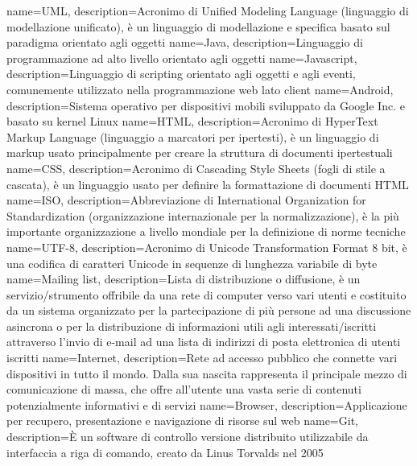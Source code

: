  {
	name=UML,
	description={Acronimo di Unified Modeling Language (linguaggio di modellazione
	unificato), è un linguaggio di modellazione e specifica basato sul paradigma
	orientato agli oggetti}
}
 {
	name=Java,
	description={Linguaggio di programmazione ad alto livello orientato agli oggetti}
}
 {
	name=Javascript,
	description={Linguaggio di scripting orientato agli oggetti e agli eventi, 
	comunemente utilizzato nella programmazione web lato client}
}
 {
	name=Android,
	description={Sistema operativo per dispositivi mobili sviluppato da Google Inc. e basato su kernel Linux}
}
 {
	name=HTML,
	description={Acronimo di HyperText Markup Language (linguaggio a marcatori per
	ipertesti), è un linguaggio di markup usato principalmente per creare la
	struttura di documenti ipertestuali}
}
 {
	name=CSS,
	description={Acronimo di Cascading Style Sheets (fogli di stile a cascata), è un linguaggio usato per
	definire la formattazione di documenti HTML}
}
 {
	name=ISO,
	description={Abbreviazione di International Organization for Standardization (organizzazione internazionale per la
	normalizzazione), è la più importante organizzazione a livello mondiale per la definizione di norme tecniche}
}
 {
	name=UTF-8,
	description={Acronimo di Unicode Transformation Format 8 bit, è una codifica di caratteri Unicode in sequenze di
	lunghezza variabile di byte}
}
 {
	name=Mailing list,
	description={Lista di distribuzione o diffusione, è un servizio/strumento offribile da una rete di computer verso
	vari utenti e costituito da un sistema organizzato per la partecipazione di più persone ad una discussione asincrona
	o per la distribuzione di informazioni utili agli interessati/iscritti attraverso l'invio di e-mail ad una lista di
	indirizzi di posta elettronica di utenti iscritti}
}
 {
	name=Internet,
	description={Rete ad accesso pubblico che connette vari dispositivi in tutto il mondo. Dalla sua nascita rappresenta
	il principale mezzo di comunicazione di massa, che offre all'utente una vasta serie di contenuti potenzialmente
	informativi e di servizi}
}
 {
	name=Browser,
	description={Applicazione per recupero, presentazione e navigazione di risorse sul web}
}
 {
	name=Git,
	description={È un software di controllo versione distribuito utilizzabile da interfaccia a riga di comando, creato da Linus Torvalds nel 2005}
}
